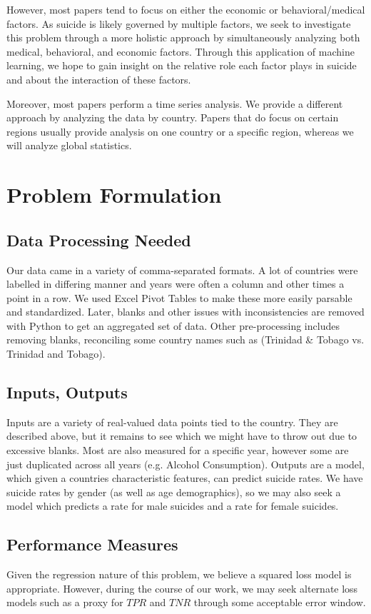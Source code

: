 \documentclass{article}
\begin{document}
\begin{multicols}{2}
However, most papers tend to focus on either the economic or behavioral/medical factors. As suicide is likely governed by multiple factors, we seek to investigate this problem through a more holistic approach by simultaneously analyzing both medical, behavioral, and economic factors. Through this application of machine learning, we hope to gain insight on the relative role each factor plays in suicide and about the interaction of these factors. 

Moreover, most papers perform a time series analysis. We provide a different approach by analyzing the data by country. Papers that do focus on certain regions usually provide analysis on one country or a specific region, whereas we will analyze global statistics. 


\section{Problem Formulation} 
\subsection{Data Processing Needed} Our data came in a variety of comma-separated formats. A lot of countries were labelled in differing manner and years were often a column and other times a point in a row. We used Excel Pivot Tables to make these more easily parsable and standardized. Later, blanks and other issues with inconsistencies are removed with Python to get an aggregated set of data. Other pre-processing includes removing blanks, reconciling some country names such as (Trinidad \& Tobago vs. Trinidad and Tobago).
\subsection{Inputs, Outputs} Inputs are a variety of real-valued data points tied to the country. They are described above, but it remains to see which we might have to throw out due to excessive blanks. Most are also measured for a specific year, however some are just duplicated across all years (e.g. Alcohol Consumption). Outputs are a model, which given a countries characteristic features, can predict suicide rates. We have suicide rates by gender (as well as age demographics), so we may also seek a model which predicts a rate for male suicides and a rate for female suicides.
\subsection{Performance Measures} Given the regression nature of this problem, we believe a squared loss model is appropriate. However, during the course of our work, we may seek alternate loss models such as a proxy for $TPR$ and $TNR$ through some acceptable error window.



\end{multicols}
\end{document}
